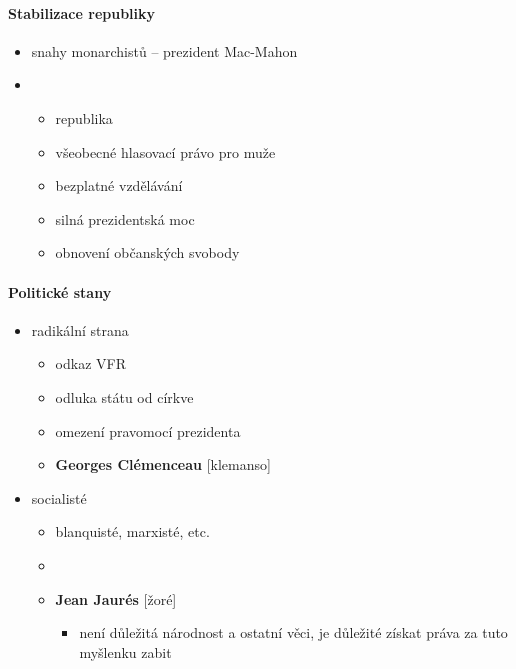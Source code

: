 \paragraph{Stabilizace republiky}
\begin{itemize}
\item snahy monarchistů -- prezident Mac-Mahon
\item {}
	\begin{itemize}
	\item republika 
	\item všeobecné hlasovací právo pro muže
	\item bezplatné vzdělávání
	\item silná prezidentská moc
	\item obnovení občanských svobody
	\end{itemize}
\end{itemize}

\paragraph{Politické stany}
\begin{itemize}
\item radikální strana
	\begin{itemize}
	\item odkaz VFR
	\item odluka státu od církve
	\item omezení pravomocí prezidenta
	\item \textbf{Georges Clémenceau} [klemanso]
	\end{itemize}
\item socialisté
	\begin{itemize}
	\item blanquisté, marxisté, etc.
	\item {}
	\item \textbf{Jean Jaurés} [žoré]
		\begin{itemize}
		\item není důležitá národnost a ostatní věci, je důležité získat práva \ra za tuto myšlenku zabit
		\end{itemize}
	\end{itemize}
\end{itemize}

